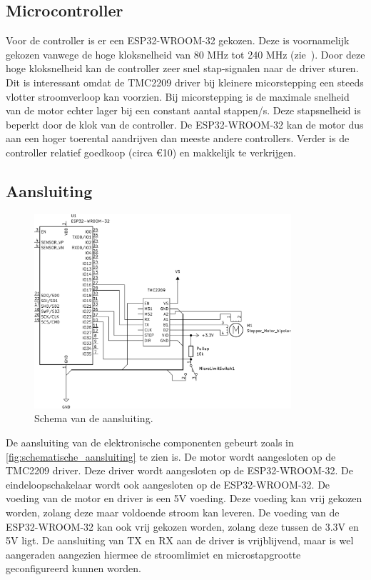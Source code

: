 \subsection{Microcontroller}
Voor de controller is er een ESP32-WROOM-32 gekozen. Deze is voornamelijk gekozen vanwege de hoge kloksnelheid van 80 MHz tot 240 MHz (zie\ \cite{RN46}). Door deze hoge kloksnelheid kan de controller zeer snel stap-signalen naar de driver sturen. Dit is interessant omdat de TMC2209 driver bij kleinere micorstepping een steeds vlotter stroomverloop kan voorzien. Bij micorstepping is de maximale snelheid van de motor echter lager bij een constant aantal stappen/s. Deze stapsnelheid is beperkt door de klok van de controller. De ESP32-WROOM-32 kan de motor dus aan een hoger toerental aandrijven dan meeste andere controllers. Verder is de controller relatief goedkoop (circa €10) en makkelijk te verkrijgen.
\subsection{Aansluiting}
\begin{figure}[H]
    \centering
    \includegraphics[width=0.85\textwidth]{figures/Wiring_BW.png}
    \caption{Schema van de aansluiting.}\label{fig:schematische_aansluiting}
\end{figure}
De aansluiting van de elektronische componenten gebeurt zoals in \autoref{fig:schematische_aansluiting} te zien is. De motor wordt aangesloten op de TMC2209 driver. Deze driver wordt aangesloten op de ESP32-WROOM-32. De eindeloopschakelaar wordt ook aangesloten op de ESP32-WROOM-32. De voeding van de motor en driver is een 5V voeding. Deze voeding kan vrij gekozen worden, zolang deze maar voldoende stroom kan leveren. De voeding van de ESP32-WROOM-32 kan ook vrij gekozen worden, zolang deze tussen de 3.3V en 5V ligt. De aansluiting van TX en RX aan de driver is vrijblijvend, maar is wel aangeraden aangezien hiermee de stroomlimiet en microstapgrootte geconfigureerd kunnen worden.

